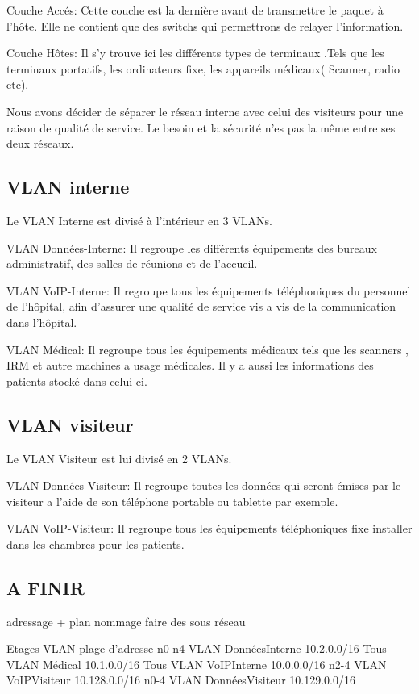 Couche Accés:
Cette couche est la dernière avant de transmettre le paquet à l'hôte. Elle ne contient que des switchs qui permettrons de relayer l'information.

Couche Hôtes:
Il s'y trouve ici les différents types de terminaux .Tels que les terminaux portatifs, les ordinateurs fixe, les appareils médicaux( Scanner, radio etc).

%
%
Nous avons décider de séparer le réseau interne avec celui des visiteurs pour une raison de qualité de service.
Le besoin et la sécurité n'es pas la même entre ses deux réseaux.

%
%
\subsection{VLAN interne}

Le VLAN Interne est divisé à l'intérieur en 3 VLANs.

VLAN Données-Interne:
Il regroupe les différents équipements des bureaux administratif, des salles de réunions et de l'accueil.

VLAN VoIP-Interne:
Il regroupe tous les équipements téléphoniques du personnel de l'hôpital, afin d'assurer une qualité de service vis a vis de la communication dans l'hôpital.

VLAN Médical:
Il regroupe tous les équipements médicaux tels que les scanners , IRM et autre machines a usage médicales. Il y a aussi les informations des patients stocké dans celui-ci.

%
%
\subsection{VLAN visiteur}

Le VLAN Visiteur est lui divisé en 2 VLANs.

VLAN Données-Visiteur:
Il regroupe toutes les données qui seront émises par le visiteur a l'aide de son téléphone portable ou tablette par exemple.

VLAN VoIP-Visiteur:
Il regroupe  tous les équipements téléphoniques fixe installer dans les chambres pour les patients.



%
%
\subsection{A FINIR}

adressage + plan nommage
faire des sous réseau

Etages
VLAN
plage d’adresse
n0-n4
VLAN DonnéesInterne
10.2.0.0/16
Tous
VLAN Médical
10.1.0.0/16
Tous
VLAN VoIPInterne
10.0.0.0/16
n2-4
VLAN
VoIPVisiteur
10.128.0.0/16
n0-4
VLAN DonnéesVisiteur
10.129.0.0/16


%
%
